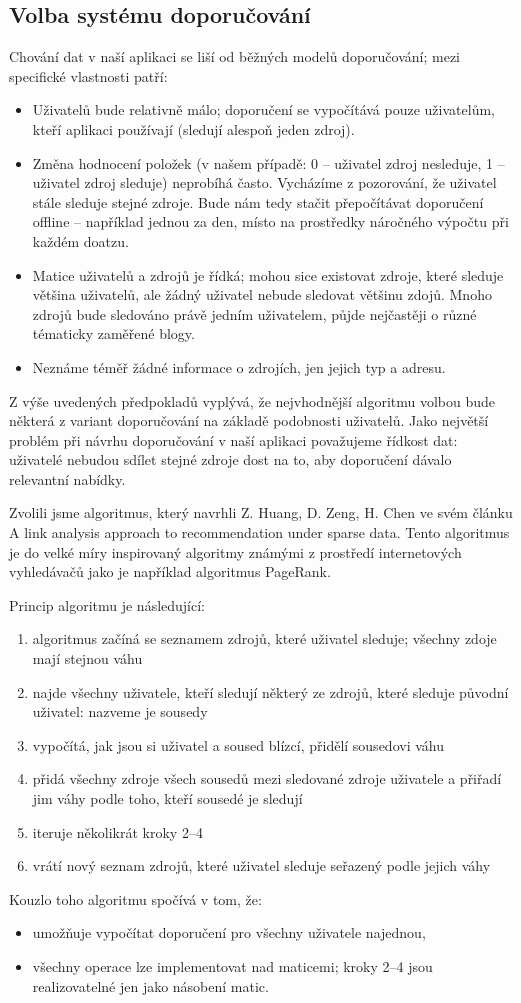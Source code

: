 \subsection{Volba systému doporučování}

Chování dat v naší aplikaci se liší od běžných modelů doporučování; mezi specifické vlastnosti patří:

\begin{itemize}
	\item Uživatelů bude relativně málo; doporučení se vypočítává pouze uživatelům, kteří aplikaci používají (sledují alespoň jeden zdroj).
	\item Změna hodnocení položek (v našem případě: 0 -- uživatel zdroj nesleduje, 1 -- uživatel zdroj sleduje) neprobíhá často.
		Vycházíme z pozorování, že uživatel stále sleduje stejné zdroje.
		Bude nám tedy stačit přepočítávat doporučení offline -- například jednou za den, místo na prostředky náročného výpočtu při každém doatzu.
	\item Matice uživatelů a zdrojů je řídká; mohou sice existovat zdroje, které sleduje většina uživatelů, ale žádný uživatel nebude sledovat většinu zdojů.
		Mnoho zdrojů bude sledováno právě jedním uživatelem, půjde nejčastěji o různé tématicky zaměřené blogy.
	\item Neznáme téměř žádné informace o zdrojích, jen jejich typ a adresu.
\end{itemize}

Z výše uvedených předpokladů vyplývá, že nejvhodnější algoritmu volbou bude některá z variant doporučování na základě podobnosti uživatelů.
Jako největší problém při návrhu doporučování v naší aplikaci považujeme řídkost dat: uživatelé nebudou sdílet stejné zdroje dost na to, aby doporučení dávalo relevantní nabídky.

Zvolili jsme algoritmus, který navrhli Z. Huang, D. Zeng, H. Chen ve svém článku A link analysis approach to recommendation under sparse data.
Tento algoritmus je do velké míry inspirovaný algoritmy známými z prostředí internetových vyhledávačů jako je například algoritmus PageRank.

Princip algoritmu je následující:
\begin{enumerate}
	\item algoritmus začíná se seznamem zdrojů, které uživatel sleduje; všechny zdoje mají stejnou váhu
	\item najde všechny uživatele, kteří sledují některý ze zdrojů, které sleduje původní uživatel: nazveme je sousedy
	\item vypočítá, jak jsou si uživatel a soused blízcí, přidělí sousedovi váhu
	\item přidá všechny zdroje všech sousedů mezi sledované zdroje uživatele a přiřadí jim váhy podle toho, kteří sousedé je sledují
	\item iteruje několikrát kroky 2--4
	\item vrátí nový seznam zdrojů, které uživatel sleduje seřazený podle jejich váhy
\end{enumerate}

Kouzlo toho algoritmu spočívá v tom, že:
\begin{itemize}
	\item umožňuje vypočítat doporučení pro všechny uživatele najednou,
	\item všechny operace lze implementovat nad maticemi; kroky 2--4 jsou realizovatelné jen jako násobení matic.
\end{itemize}
